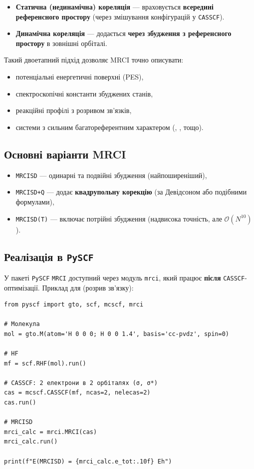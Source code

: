\begin{itemize}
    \item \textbf{Статична (нединамічна) кореляція} --- враховується \textbf{всередині референсного простору} (через змішування конфігурацій у \texttt{CASSCF}).
    \item \textbf{Динамічна кореляція} --- додається \textbf{через збудження з референсного простору} в зовнішні орбіталі.
\end{itemize}

Такий двоетапний підхід дозволяє MRCI точно описувати:
\begin{itemize}
    \item потенціальні енергетичні поверхні (PES),
    \item спектроскопічні константи збуджених станів,
    \item реакційні профілі з розривом зв’язків,
    \item системи з сильним багатореферентним характером (, ,  тощо).
\end{itemize}

\subsection{Основні варіанти MRCI}

\begin{itemize}
    \item \texttt{MRCISD} --- одинарні та подвійні збудження (найпоширеніший),
    \item \texttt{MRCISD+Q} --- додає \textbf{квадрупольну корекцію} (за Девідсоном або подібними формулами),
    \item \texttt{MRCISD(T)} --- включає потрійні збудження (надвисока точність, але $\mathcal{O}(N^{10})$).
\end{itemize}

\subsection{Реалізація в \texttt{PySCF}}

У пакеті \texttt{PySCF} \texttt{MRCI} доступний через модуль \texttt{mrci}, який працює \textbf{після} \texttt{CASSCF}-оптимізації. Приклад для  (розрив зв’язку):

\begin{verbatim}
from pyscf import gto, scf, mcscf, mrci

# Молекула
mol = gto.M(atom='H 0 0 0; H 0 0 1.4', basis='cc-pvdz', spin=0)

# HF
mf = scf.RHF(mol).run()

# CASSCF: 2 електрони в 2 орбіталях (σ, σ*)
cas = mcscf.CASSCF(mf, ncas=2, nelecas=2)
cas.run()

# MRCISD
mrci_calc = mrci.MRCI(cas)
mrci_calc.run()

print(f"E(MRCISD) = {mrci_calc.e_tot:.10f} Eh")
\end{verbatim}

